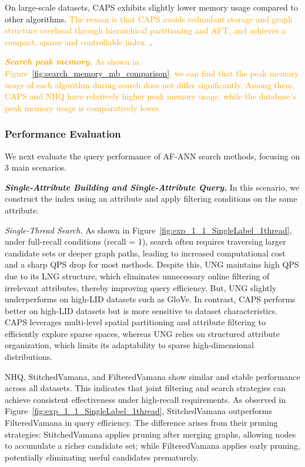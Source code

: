 \documentclass[sigconf, nonacm]{acmart}
\begin{document}
	On large-scale datasets, CAPS exhibits slightly lower memory usage compared to other algorithms. \textcolor{orange}{The reason is that CAPS avoids redundant storage and graph structure overhead through hierarchical partitioning and AFT, and achieves a compact, sparse and controllable index. }.
	
	\textit{\textbf{ \textcolor{orange}{Search peak memory.}}}
	 \textcolor{orange}{As shown in Figure~\ref{fig:search_memory_mb_comparison}, we can find that the peak memory usage of each algorithm during search does not differ significantly. Among them, CAPS and NHQ have relatively higher peak memory usage, while the database's peak memory usage is comparatively lower.}
	
	\subsubsection{Performance Evaluation}
	
	
	
	
	We next evaluate the query performance of AF-ANN search methods, focusing on 3 main scenarios.
	
	\textit{\textbf{Single-Attribute Building and Single-Attribute Query.}}
	In this scenario, we construct the index using an attribute and apply filtering conditions on the same attribute.
	
	
	\textit{Single-Thread Search.}  
	As shown in Figure~\ref{fig:exp_1_1_SingleLabel_1thread}, under full-recall conditions (recall = 1), search often requires traversing larger candidate sets or deeper graph paths, leading to increased computational cost and a sharp QPS drop for most methods. Despite this, UNG maintains high QPS due to its LNG structure, which eliminates unnecessary online filtering of irrelevant attributes, thereby improving query efficiency. But, UNG slightly underperforms on high-LID datasets such as GloVe. In contrast, CAPS performs better on high-LID datasets but is more sensitive to dataset characteristics. CAPS leverages multi-level spatial partitioning and attribute filtering to efficiently explore sparse spaces, whereas UNG relies on structured attribute organization, which limits its adaptability to sparse high-dimensional distributions.
	
	NHQ, StitchedVamana, and FilteredVamana show similar and stable performance across all datasets. This indicates that joint filtering and search strategies can achieve consistent effectiveness under high-recall requirements. As observed in Figure~\ref{fig:exp_1_1_SingleLabel_1thread}, StitchedVamana outperforms FilteredVamana in query efficiency. The difference arises from their pruning strategies: StitchedVamana applies pruning after merging graphs, allowing nodes to accumulate a richer candidate set; while FilteredVamana applies early pruning, potentially eliminating useful candidates prematurely.
	
\end{document}
